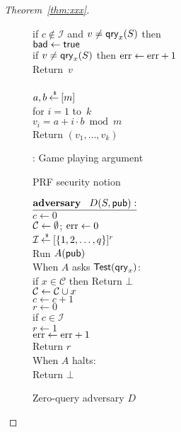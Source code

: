 \begin{proof}[Theorem~\ref{thm:xxx}]
\begin{figure}[tp]
{{if $c \not\in \mathcal{I}$ and $v \neq \mathsf{qry}_x(S)$ then \\
\nudge $\mathsf{bad} \gets \mathsf{true}$\\
if $v \neq \mathsf{qry}_x(S)$ then $\mathrm{err} \gets \mathrm{err} +1$\\
Return~$v$\\
%
\\
$a,b {\:\stackrel{{\scriptscriptstyle \hspace{0.2em}\$}} {\leftarrow}\:} [m]$\\
for $i = 1$ to~$k$\\
\nudge $v_i = a+i \cdot b \bmod m$\\
Return $\left(v_1,\ldots,v_k\right)$
}
}
\caption{: Game playing argument}\label{fig:Game}
\end{figure}


\begin{figure}[tp]
\centering
{}
\caption{PRF security notion}\label{fig:prf}
\end{figure}

\begin{figure}
\centering
{}
{
${\underline{\textbf{adversary}\hspace*{2ex} {D(S, {\sf pub})}:}}$\\[4pt]
$c \gets 0$\\%
${\cal C} \gets \emptyset$; $\mathrm{err} \gets 0$\\
$\mathcal{I}{\:\stackrel{{\scriptscriptstyle \hspace{0.2em}\$}} {\leftarrow}\:} [\{1,2,\ldots,q\}]^r$\\
Run $A({\sf pub})$\\
When $A$ asks $\mathsf{Test}(\mathsf{qry}_x)$:\\
\nudge if $x \in \mathcal{C}$ then Return $\bot$\\
\nudge ${\cal C} \gets {\cal C} \cup x$\\
\nudge $c \gets c+1$\\
\nudge $r \gets 0$\\
\nudge if $c \in \mathcal{I}$\\
\nudge \nudge $r \gets 1$\\
\nudge \nudge $\mathrm{err} \gets \mathrm{err} + 1$\\
\nudge Return $r$\\
When $A$ halts:\\
\nudge Return $\bot$
}
\caption{Zero-query adversary $D$} \label{fig:D}
\end{figure}	

\end{proof}

